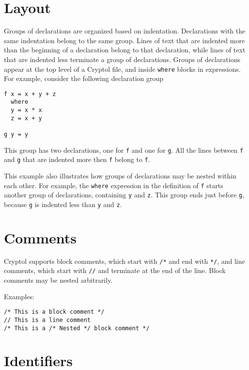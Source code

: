 \section{Layout}\label{layout}

Groups of declarations are organized based on indentation. Declarations
with the same indentation belong to the same group. Lines of text that
are indented more than the beginning of a declaration belong to that
declaration, while lines of text that are indented less terminate a
group of declarations. Groups of declarations appear at the top level of
a Cryptol file, and inside \texttt{where} blocks in expressions. For
example, consider the following declaration group

\begin{verbatim}
f x = x + y + z
  where
  y = x * x
  z = x + y

g y = y
\end{verbatim}

This group has two declarations, one for \texttt{f} and one for
\texttt{g}. All the lines between \texttt{f} and \texttt{g} that are
indented more then \texttt{f} belong to \texttt{f}.

This example also illustrates how groups of declarations may be nested
within each other. For example, the \texttt{where} expression in the
definition of \texttt{f} starts another group of declarations,
containing \texttt{y} and \texttt{z}. This group ends just before
\texttt{g}, because \texttt{g} is indented less than \texttt{y} and
\texttt{z}.

\section{Comments}\label{comments}

Cryptol supports block comments, which start with \texttt{/*} and end
with \texttt{*/}, and line comments, which start with \texttt{//} and
terminate at the end of the line. Block comments may be nested
arbitrarily.

Examples:

\begin{verbatim}
/* This is a block comment */
// This is a line comment
/* This is a /* Nested */ block comment */
\end{verbatim}

\section{Identifiers}\label{identifiers}

